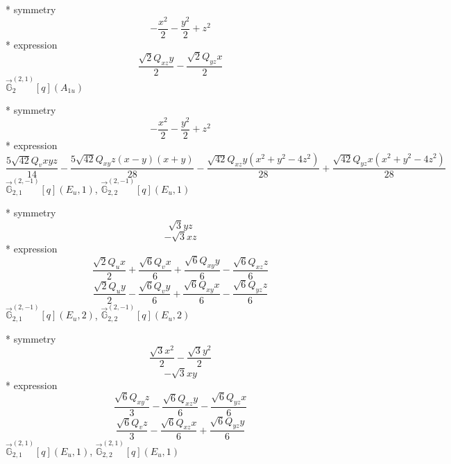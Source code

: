 \documentclass[fleqn,8pt]{jsarticle}
\begin{document}
\noindent\quad ** symmetry
\begin{dmath*}
- \frac{x^{2}}{2} - \frac{y^{2}}{2} + z^{2}
\end{dmath*}
\noindent\quad ** expression
\begin{dmath*}
\frac{\sqrt{2} Q_{xz} y}{2} - \frac{\sqrt{2} Q_{yz} x}{2}
\end{dmath*}
\noindent\quad $\vec{\mathbb{G}}_{2}^{(2,1)}[q](A_{1u})$

\noindent\quad ** symmetry
\begin{dmath*}
- \frac{x^{2}}{2} - \frac{y^{2}}{2} + z^{2}
\end{dmath*}
\noindent\quad ** expression
\begin{dmath*}
\frac{5 \sqrt{42} Q_{v} x y z}{14} - \frac{5 \sqrt{42} Q_{xy} z \left(x - y\right) \left(x + y\right)}{28} - \frac{\sqrt{42} Q_{xz} y \left(x^{2} + y^{2} - 4 z^{2}\right)}{28} + \frac{\sqrt{42} Q_{yz} x \left(x^{2} + y^{2} - 4 z^{2}\right)}{28}
\end{dmath*}
\noindent\quad $\vec{\mathbb{G}}_{2,1}^{(2,-1)}[q](E_{u},1)$, $\vec{\mathbb{G}}_{2,2}^{(2,-1)}[q](E_{u},1)$

\noindent\quad ** symmetry
\begin{dmath*}
\sqrt{3} y z
\end{dmath*}
\begin{dmath*}
- \sqrt{3} x z
\end{dmath*}
\noindent\quad ** expression
\begin{dmath*}
\frac{\sqrt{2} Q_{u} x}{2} + \frac{\sqrt{6} Q_{v} x}{6} + \frac{\sqrt{6} Q_{xy} y}{6} - \frac{\sqrt{6} Q_{xz} z}{6}
\end{dmath*}
\begin{dmath*}
\frac{\sqrt{2} Q_{u} y}{2} - \frac{\sqrt{6} Q_{v} y}{6} + \frac{\sqrt{6} Q_{xy} x}{6} - \frac{\sqrt{6} Q_{yz} z}{6}
\end{dmath*}
\noindent\quad $\vec{\mathbb{G}}_{2,1}^{(2,-1)}[q](E_{u},2)$, $\vec{\mathbb{G}}_{2,2}^{(2,-1)}[q](E_{u},2)$

\noindent\quad ** symmetry
\begin{dmath*}
\frac{\sqrt{3} x^{2}}{2} - \frac{\sqrt{3} y^{2}}{2}
\end{dmath*}
\begin{dmath*}
- \sqrt{3} x y
\end{dmath*}
\noindent\quad ** expression
\begin{dmath*}
\frac{\sqrt{6} Q_{xy} z}{3} - \frac{\sqrt{6} Q_{xz} y}{6} - \frac{\sqrt{6} Q_{yz} x}{6}
\end{dmath*}
\begin{dmath*}
\frac{\sqrt{6} Q_{v} z}{3} - \frac{\sqrt{6} Q_{xz} x}{6} + \frac{\sqrt{6} Q_{yz} y}{6}
\end{dmath*}
\noindent\quad $\vec{\mathbb{G}}_{2,1}^{(2,1)}[q](E_{u},1)$, $\vec{\mathbb{G}}_{2,2}^{(2,1)}[q](E_{u},1)$
\end{document}

